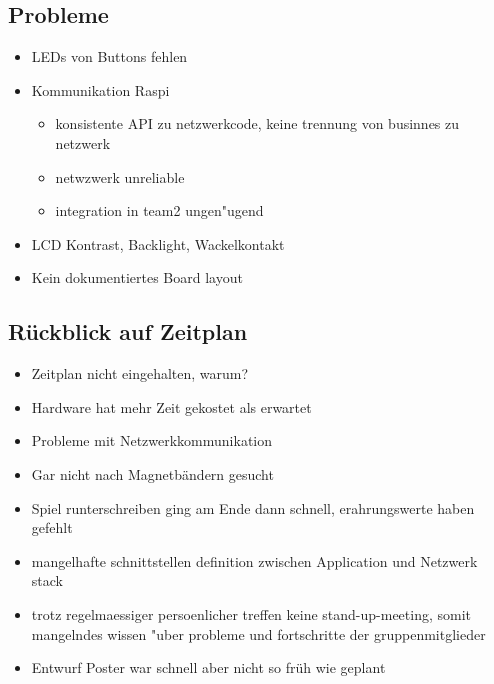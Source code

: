 \documentclass[a4paper]{article}
\begin{document}
  \subsection{Probleme}
    \begin{itemize}
      \item LEDs von Buttons fehlen
      \item Kommunikation Raspi
        \begin{itemize}
          \item konsistente API zu netzwerkcode, keine trennung von businnes zu netzwerk
          \item netwzwerk unreliable
          \item integration in team2 ungen"ugend
        \end{itemize}
      \item LCD Kontrast, Backlight, Wackelkontakt
      \item Kein dokumentiertes Board layout
    \end{itemize}
  \subsection{Rückblick auf Zeitplan}
    \begin{itemize}
      \item Zeitplan nicht eingehalten, warum?
      \item Hardware hat mehr Zeit gekostet als erwartet
      \item Probleme mit Netzwerkkommunikation
      \item Gar nicht nach Magnetbändern gesucht
      \item Spiel runterschreiben ging am Ende dann schnell, erahrungswerte haben gefehlt
      \item mangelhafte schnittstellen definition zwischen Application und Netzwerk stack
      \item trotz regelmaessiger persoenlicher treffen keine stand-up-meeting, somit mangelndes wissen "uber probleme und fortschritte der gruppenmitglieder
      \item Entwurf Poster war schnell aber nicht so früh wie geplant
    \end{itemize}
\end{document}
